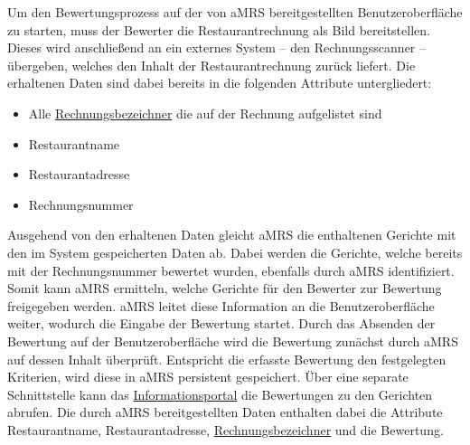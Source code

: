 \newparagraph
Um den Bewertungsprozess auf der von \ac{aMRS} bereitgestellten Benutzeroberfläche zu starten, muss der Bewerter die Restaurantrechnung als Bild bereitstellen.
Dieses wird anschließend an ein externes System -- den Rechnungsscanner -- übergeben, welches den Inhalt der Restaurantrechnung zurück liefert.
Die erhaltenen Daten sind dabei bereits in die folgenden Attribute untergliedert:
\begin{itemize}
  \item Alle \hyperref[gls:Rechnungsbezeichner]{Rechnungsbezeichner} die auf der Rechnung aufgelistet sind
  \item Restaurantname
  \item Restaurantadresse
  \item Rechnungsnummer
\end{itemize}
Ausgehend von den erhaltenen Daten gleicht \ac{aMRS} die enthaltenen Gerichte mit den im System gespeicherten Daten ab.
Dabei werden die Gerichte, welche bereits mit der Rechnungsnummer bewertet wurden, ebenfalls durch \ac{aMRS} identifiziert.
Somit kann \ac{aMRS} ermitteln, welche Gerichte für den Bewerter zur Bewertung freigegeben werden.
\ac{aMRS} leitet diese Information an die Benutzeroberfläche weiter, wodurch die Eingabe der Bewertung startet.
\newparagraph
Durch das Absenden der Bewertung auf der Benutzeroberfläche wird die Bewertung zunächst durch \ac{aMRS} auf dessen Inhalt überprüft.
Entspricht die erfasste Bewertung den festgelegten Kriterien, wird diese in \ac{aMRS} persistent gespeichert.
\newparagraph
Über eine separate Schnittstelle kann das \hyperref[gls:informationsportal]{Informationsportal} die Bewertungen zu den Gerichten abrufen.
Die durch \ac{aMRS} bereitgestellten Daten enthalten dabei die Attribute Restaurantname, Restaurantadresse, \hyperref[gls:Rechnungsbezeichner]{Rechnungsbezeichner} und die Bewertung.
